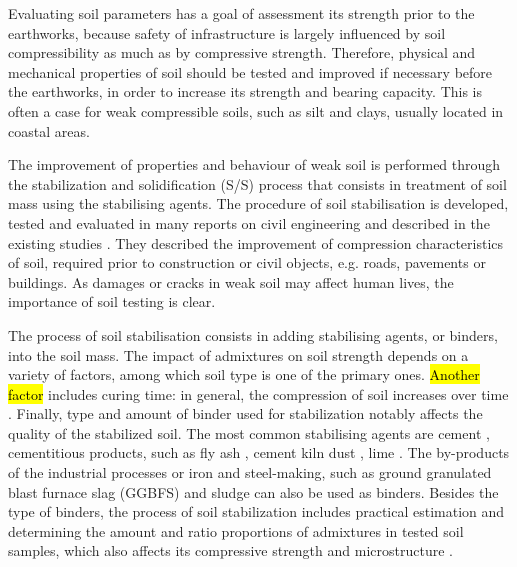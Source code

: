 \documentclass{amestyle}
\begin{document}
Evaluating soil parameters has a goal of assessment its strength prior to the earthworks, because safety of infrastructure is largely influenced by soil compressibility as much as by compressive strength. Therefore, physical and mechanical properties of soil should be tested and improved if necessary before the earthworks, in order to increase its strength and bearing capacity. This is often a case for weak compressible soils, such as silt and clays, usually located in coastal areas. 

The improvement of properties and behaviour of weak soil is performed through the stabilization and solidification (S/S) process that consists in treatment of soil mass using the stabilising agents. The procedure of soil stabilisation is developed, tested and evaluated in many reports on civil engineering and described in the existing studies \cite{Jauberthie,Lindh202102,ArabiWild,Lindh2004}. They described the improvement of compression characteristics of soil, required prior to construction or civil objects, e.g. roads, pavements or buildings. As damages or cracks in weak soil may affect human lives, the importance of soil testing is clear. 

The process of soil stabilisation consists in adding stabilising agents, or binders, into the soil mass. The impact of admixtures on soil strength depends on a variety of factors, among which soil type is one of the primary ones. \hl{Another factor} includes curing time: in general, the compression of soil increases over time \cite{Lindh202102}. Finally, type and amount of binder used for stabilization notably affects the quality of the stabilized soil. The most common stabilising agents are cement \cite{Rekik}, cementitious products, such as fly ash \cite{Tastan,Hasan}, cement kiln dust \cite{Solanki,Lindh2021a}, lime \cite{ARULRAJAH2017999,BIAN20211124,ANDAVAN20201125,INDIRAMMA2020694}. The by-products of the industrial processes or iron and steel-making, such as ground granulated blast furnace slag (GGBFS) \cite{Mozejko} and sludge \cite{Ingunza,Sharif} can also be used as binders. Besides the type of binders, the process of soil stabilization includes practical estimation and determining the amount and ratio proportions of admixtures in tested soil samples, which also affects its compressive strength and microstructure \cite{Lindh2001,Ahmed}.
\end{document}
